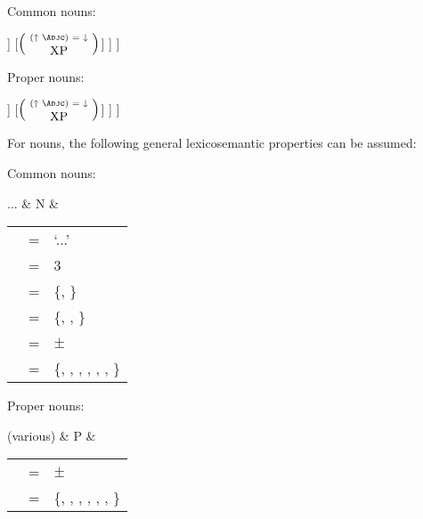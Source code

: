 \ex\label{ex:npcstruct}
\begin{minipage}[t]{.5\linewidth}%
\tl\quad Common nouns:\\

\quad\begin{forest}
[\anno{\pass{df} \logor{} \pass{gf} \logor{} \updown}{NP}
	[\anno{\updown}{\xbar{N}}
		[\anno{\updown}{\xhead{N}}
			[\anno{\updown}{N\tsub{stem}}]
			[\anno{\updown}{\mbox{-N\tsub{infl}}}]
		]
		[$\left(\anno{\pass{\Adjc}}{XP}\right)$]
	]
]
\end{forest}
\end{minipage}
%
\begin{minipage}[t]{.5\linewidth}%
\tl\quad Proper nouns:\\

\quad\begin{forest}
[\anno{\pass{df} \logor{} \pass{gf} \logor{} \updown}{NP}
	[\anno{\updown}{\xbar{N}}
		[\anno{\updown}{\xhead{N}}
			[\anno{\updown}{\^P}]
			[\anno{\updown}{\xhead{N}}]
		]
		[$\left(\anno{\pass{\Adjc}}{XP}\right)$]
	]
]
\end{forest}
\end{minipage}
\xe


For nouns, the following general lexicosemantic properties can be assumed:

\pex
\a Common nouns:\\

	\begin{tabu} {}
	...
		& N
		& \begin{tabular}[t]{l l l}
			\ups{\Pred} & = & `...' \\
			\ups{\Pers} & = & 3 \\
			\ups{\Num} & = & \{\Sg{}, \Pl{}\} \\
			\ups{\Gend} & = & \{\M{}, \F{}, \N{}\} \\
			\ups{\Anim} & = & $\pm$ \\
			\ups{\Case} & = & \{\Aarg{}, \Parg{}, \Dat{}, \Gen{}, 
				\Loc{}, \Ins{}, \Caus{}\} \\
		\end{tabular}
	\end{tabu}

\a Proper nouns:\\

	\begin{tabu} {}
	(various)
		& P
		& \begin{tabular}[t]{l l l}
			\ups{\Anim} & = & $\pm$ \\
			\ups{\Case} & = & \{\Aarg{}, \Parg{}, \Dat{}, \Gen{}, 
				\Loc{}, \Ins{}, \Caus{}\} \\
		\end{tabular}
	\end{tabu}\medskip

